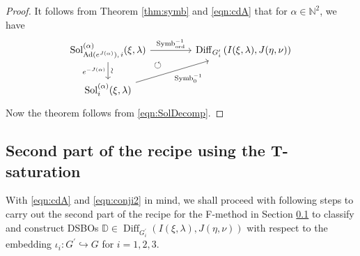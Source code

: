 \documentclass[a4paper,11pt,reqno]{amsart}
\newcommand{\DD}{\mathbb{D}}
\newcommand{\NN}{\mathbb{N}}
\newcommand{\0}{{\bf 0}}
\newcommand{\1}{{\bf 1}}
\DeclareMathOperator{\Ad}{Ad}
\newcommand{\ord}{{\mathrm{ord}}}
\DeclareMathOperator{\Diff}{Diff}
\DeclareMathOperator{\Sol}{Sol}
\DeclareMathOperator{\Symb}{Symb}
\theoremstyle{plain}
\theoremstyle{definition}
\numberwithin{equation}{section}
\theoremstyle{definition}
\begin{document}
\begin{proof}
It follows from Theorem \ref{thm:symb} and \eqref{eqn:cdA} that
for $\alpha \in \NN^2$, we have
\begin{equation}\label{eqn:conji2}
\begin{tikzcd}[column sep=1.5cm]
	{ \Sol_{\Ad(e^{J(\alpha)}),\,i}^{(\alpha)}(\xi,\lambda)}  	
	&{\Diff_{G_i^\prime}\left(I(\xi, \lambda), J(\eta, \nu)\right)} \\
	 {\Sol_i^{(\alpha)}(\xi,\lambda)} &
	\arrow[ul, pos=0.886, phantom, "\circlearrowleft"]
	\arrow["\Symb_{\ord}^{-1}",  from=1-1, to=1-2]
	\arrow[ "\Symb_0^{-1}"', from=2-1, to=1-2]
	\arrow["\sim" sloped, "e^{-J(\alpha)}"',  from=1-1, to=2-1]
\end{tikzcd}
\end{equation}
Now the theorem follows from \eqref{eqn:SolDecomp}.
\end{proof}

\subsection{Second part of the recipe using the T-saturation}
\label{sec:recipe2}

With \eqref{eqn:cdA} and \eqref{eqn:conji2} in mind,
we shall proceed with following steps to carry out the second part of the 
recipe for the F-method in Section \ref{sec:recipe2}
to classify and construct DSBOs 
$\DD \in \Diff_{G_i^\prime}(I(\xi,\lambda),J(\eta,\nu))$ 
with respect to the embedding $\iota_i \colon G^\prime \hookrightarrow G$ for $i=1,2,3$.
\vspace{3pt}
\end{document}
